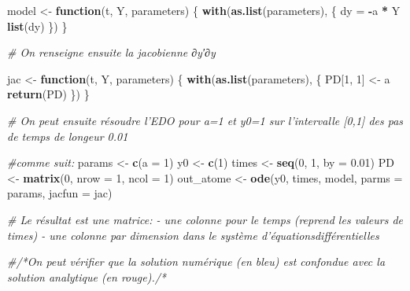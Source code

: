 \documentclass[
]{article}
\newenvironment{Shaded}{\begin{snugshade}}{\end{snugshade}}
\newcommand{\AttributeTok}[1]{\textcolor[rgb]{0.13,0.29,0.53}{#1}}
\newcommand{\CommentTok}[1]{\textcolor[rgb]{0.56,0.35,0.01}{\textit{#1}}}
\newcommand{\ControlFlowTok}[1]{\textcolor[rgb]{0.13,0.29,0.53}{\textbf{#1}}}
\newcommand{\DecValTok}[1]{\textcolor[rgb]{0.00,0.00,0.81}{#1}}
\newcommand{\FloatTok}[1]{\textcolor[rgb]{0.00,0.00,0.81}{#1}}
\newcommand{\FunctionTok}[1]{\textcolor[rgb]{0.13,0.29,0.53}{\textbf{#1}}}
\newcommand{\NormalTok}[1]{#1}
\newcommand{\OtherTok}[1]{\textcolor[rgb]{0.56,0.35,0.01}{#1}}
\newcommand{\SpecialCharTok}[1]{\textcolor[rgb]{0.81,0.36,0.00}{\textbf{#1}}}
\begin{document}
\begin{Shaded}
\begin{Highlighting}[]
\NormalTok{model }\OtherTok{\textless{}{-}} \ControlFlowTok{function}\NormalTok{(t, Y, parameters) \{}
  \FunctionTok{with}\NormalTok{(}\FunctionTok{as.list}\NormalTok{(parameters), \{}
\NormalTok{    dy }\OtherTok{=} \SpecialCharTok{{-}}\NormalTok{a }\SpecialCharTok{*}\NormalTok{ Y}
    \FunctionTok{list}\NormalTok{(dy)}
\NormalTok{  \})}
\NormalTok{\}}

\CommentTok{\# On renseigne ensuite la jacobienne ∂y′∂y}

\NormalTok{jac }\OtherTok{\textless{}{-}} \ControlFlowTok{function}\NormalTok{(t, Y, parameters) \{}
  \FunctionTok{with}\NormalTok{(}\FunctionTok{as.list}\NormalTok{(parameters), \{}
\NormalTok{    PD[}\DecValTok{1}\NormalTok{, }\DecValTok{1}\NormalTok{] }\OtherTok{\textless{}{-}}\NormalTok{ a}
    \FunctionTok{return}\NormalTok{(PD)}
\NormalTok{  \})}
\NormalTok{\}}

\CommentTok{\# On peut ensuite résoudre l’EDO pour a=1 et y0=1 sur l’intervalle [0,1] des pas de temps de longeur 0.01}

\CommentTok{\#comme suit:}
\NormalTok{params }\OtherTok{\textless{}{-}} \FunctionTok{c}\NormalTok{(}\AttributeTok{a =} \DecValTok{1}\NormalTok{)}
\NormalTok{y0     }\OtherTok{\textless{}{-}} \FunctionTok{c}\NormalTok{(}\DecValTok{1}\NormalTok{)}
\NormalTok{times  }\OtherTok{\textless{}{-}} \FunctionTok{seq}\NormalTok{(}\DecValTok{0}\NormalTok{, }\DecValTok{1}\NormalTok{, }\AttributeTok{by =} \FloatTok{0.01}\NormalTok{)}
\NormalTok{PD     }\OtherTok{\textless{}{-}} \FunctionTok{matrix}\NormalTok{(}\DecValTok{0}\NormalTok{, }\AttributeTok{nrow =} \DecValTok{1}\NormalTok{, }\AttributeTok{ncol =} \DecValTok{1}\NormalTok{)}
\NormalTok{out\_atome }\OtherTok{\textless{}{-}} \FunctionTok{ode}\NormalTok{(y0, times, model, }\AttributeTok{parms =}\NormalTok{ params, }\AttributeTok{jacfun =}\NormalTok{ jac)}

\CommentTok{\# Le résultat est une matrice: {-} une colonne pour le temps (reprend les valeurs de times) {-} une colonne par dimension dans le système d’équationsdifférentielles}

\CommentTok{\#/*On peut vérifier que la solution numérique (en bleu) est confondue avec la solution analytique (en rouge)./*}


\end{Highlighting}
\end{Shaded}
\end{document}
